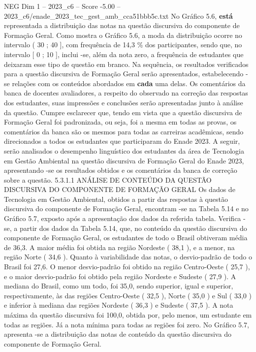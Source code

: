 \begin{textsample}{NEG Dim 1 – 2023\_c6 – Score -5.00 – 2023\_c6/enade\_2023\_tec\_gest\_amb\_cca51bbb5c.txt}
No Gráfico 5.6, \textbf{está} representada a distribuição das notas na questão discursiva do componente de Formação Geral.
Como mostra o Gráfico 5.6, a moda da distribuição ocorre no intervalo ( 30 ; 40 ], com frequência de 14,3 \% dos participantes, sendo que, no intervalo [ 0 ; 10 ], inclui -se, além da nota zero, a frequência de estudantes que deixaram esse tipo de questão em branco.
Na sequência, os resultados verificados para a questão discursiva de Formação Geral serão apresentados, estabelecendo -se relações com os conteúdos abordados em \textbf{cada} uma delas.
Os comentários da banca de docentes avaliadores, a respeito do observado na correção das respostas dos estudantes, suas impressões e conclusões serão apresentadas junto à análise da questão.
Cumpre esclarecer que, tendo em vista que a questão discursiva de Formação Geral foi padronizada, ou seja, foi a mesma em todas as provas, os comentários da banca são os mesmos para todas as carreiras acadêmicas, sendo direcionados a todos os estudantes que participaram do Enade 2023.
A seguir, serão analisados o desempenho linguístico dos estudantes da área de Tecnologia em Gestão Ambiental na questão discursiva de Formação Geral do Enade 2023, apresentando -se os resultados obtidos e os comentários da banca de correção sobre a questão. 5.3.1.1 ANÁLISE DE CONTEÚDO DA QUESTÃO DISCURSIVA DO COMPONENTE DE FORMAÇÃO GERAL Os dados de Tecnologia em Gestão Ambiental, obtidos a partir das respostas à questão discursiva do componente de Formação Geral, encontram -se na Tabela 5.14 e no Gráfico 5.7, exposto após a apresentação dos dados da referida tabela.
Verifica -se, a partir dos dados da Tabela 5.14, que, no conteúdo da questão discursiva do componente de Formação Geral, os estudantes de todo o Brasil obtiveram média de 36,3.
A maior média foi obtida na região Nordeste ( 38,1 ), e a menor, na região Norte ( 34,6 ).
Quanto à variabilidade das notas, o desvio-padrão de todo o Brasil foi 27,6.
O menor desvio-padrão foi obtido na região Centro-Oeste ( 25,7 ), e o maior desvio-padrão foi obtido pela região Nordeste e Sudeste ( 27,9 ).
A mediana do Brasil, como um todo, foi 35,0, sendo superior, igual e superior, respectivamente, às das regiões Centro-Oeste ( 32,5 ), Norte ( 35,0 ) e Sul ( 33,0 ) e inferior à mediana das regiões Nordeste ( 36,3 ) e Sudeste ( 37,5 ).
A nota máxima da questão discursiva foi 100,0, obtida por, pelo menos, um estudante em todas as regiões.
Já a nota mínima para todas as regiões foi zero.
No Gráfico 5.7, apresenta -se a distribuição das notas de conteúdo da questão discursiva do componente de Formação Geral.

\end{textsample}
